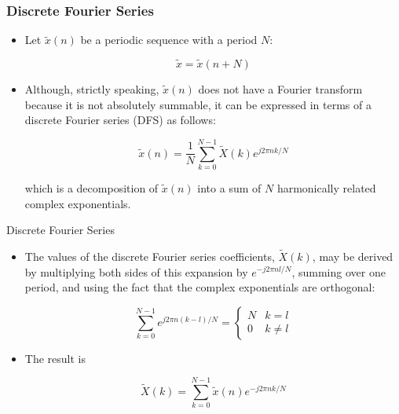 \documentclass[pdflatex,compress,mathserif]{beamer}
\begin{document}
\begin{frame}
	\frametitle{Discrete Fourier Series}
	\begin{itemize}
		\item Let $ \tilde{x}(n) $ be a periodic sequence with a period $ N $:
		
		\begin{equation*}
			\tilde{x} = \tilde{x}(n + N)
		\end{equation*}
		
		\item 	Although, strictly speaking, $ \tilde{x}(n) $ does not have a Fourier transform because it is not absolutely summable, it can be expressed in terms of a discrete Fourier series (DFS) as follows:
		
		\begin{equation}\label{6.1}
			\tilde{x}(n) = \frac{1}{N} \sum\limits_{k=0}^{N-1} \tilde{X}(k)e^{j2 \pi nk / N}
		\end{equation}
	
		which is a decomposition of $ \tilde{x}(n) $ into a sum of $ N $ harmonically related complex exponentials.
	\end{itemize}
\end{frame}

\begin{frame}{Discrete Fourier Series}
	\begin{itemize}
		\item The values of the discrete Fourier series coefficients, $ \tilde{X}(k) $, may be derived by multiplying both sides of this expansion by $ e^{-j2\pi nl/N} $, summing over one period, and using the fact that the complex exponentials are orthogonal:
		
		\begin{equation*}
			\sum\limits_{k=0}^{N-1} e^{j2 \pi n (k-l)/N} =
			\begin{cases}
				N & k = l \\
				0 & k \neq l
			\end{cases}
		\end{equation*}
		
		\item The result is
		
		\begin{equation}\label{6.2}
			\tilde{X}(k) = \sum\limits_{k=0}^{N-1} \tilde{x}(n)e^{-j2 \pi n k / N}
		\end{equation}
	\end{itemize}
	 
\end{frame}
\end{document}
